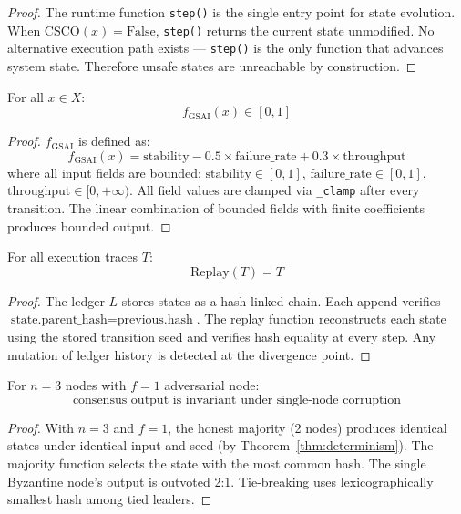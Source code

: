 \begin{proof}
The runtime function \texttt{step()} is the single entry point for state evolution. When $\text{CSCO}(x) = \text{False}$, \texttt{step()} returns the current state unmodified. No alternative execution path exists — \texttt{step()} is the only function that advances system state. Therefore unsafe states are unreachable by construction. \end{proof}

\begin{theorem}
\label{thm:bounded}
For all $x \in X$:
\[
f_{\text{GSAI}}(x) \in [0, 1]
\]
\end{theorem}

\begin{proof}
$f_{\text{GSAI}}$ is defined as:
\[
f_{\text{GSAI}}(x) = \text{stability} - 0.5 \times \text{failure\_rate} + 0.3 \times \text{throughput}
\]
where all input fields are bounded: $\text{stability} \in [0,1]$, $\text{failure\_rate} \in [0,1]$, $\text{throughput} \in [0, +\infty)$. All field values are clamped via \texttt{\_clamp} after every transition. The linear combination of bounded fields with finite coefficients produces bounded output. \end{proof}

\begin{theorem}
\label{thm:replay}
For all execution traces $T$:
\[
\text{Replay}(T) = T
\]
\end{theorem}

\begin{proof}
The ledger $L$ stores states as a hash-linked chain. Each append verifies $\text{state.parent\_hash} = \text{previous.hash}$. The replay function reconstructs each state using the stored transition seed and verifies hash equality at every step. Any mutation of ledger history is detected at the divergence point. \end{proof}

\begin{theorem}
\label{thm:byzantine}
For $n = 3$ nodes with $f = 1$ adversarial node:
\[
\text{consensus output is invariant under single-node corruption}
\]
\end{theorem}

\begin{proof}
With $n=3$ and $f=1$, the honest majority (2 nodes) produces identical states under identical input and seed (by Theorem~\ref{thm:determinism}). The majority function selects the state with the most common hash. The single Byzantine node's output is outvoted 2:1. Tie-breaking uses lexicographically smallest hash among tied leaders. \end{proof}

